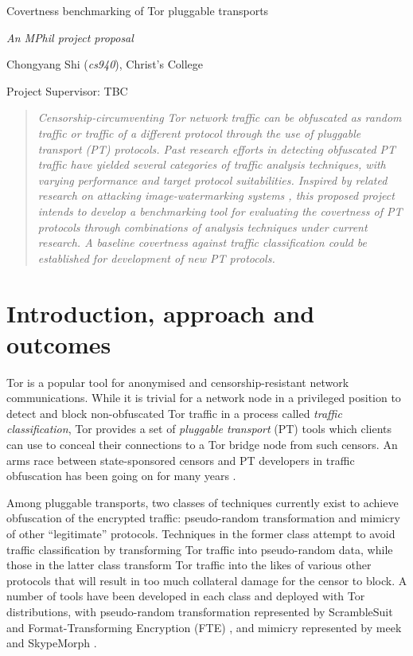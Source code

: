 \documentclass[11pt]{article}
\begin{document}
\centerline{\Large Covertness benchmarking of Tor pluggable transports}
\vspace{2em}
\centerline{\Large \emph{An MPhil project proposal}}
\vspace{2em}
\centerline{\large Chongyang Shi (\emph{cs940}), Christ's College}
\vspace{1em}
\centerline{\large Project Supervisor: TBC}
\vspace{1em}

\begin{abstract}
\textsl{Censorship-circumventing Tor network traffic can be obfuscated as random traffic or traffic of a different protocol through the use of pluggable transport (PT) protocols. Past research efforts in detecting obfuscated PT traffic have yielded several categories of traffic analysis techniques, with varying performance and target protocol suitabilities. Inspired by related research on attacking image-watermarking systems \cite{petitcolas1998attacks}, this proposed project intends to develop a benchmarking tool for evaluating the covertness of PT protocols through combinations of analysis techniques under current research. A baseline covertness against traffic classification could be established for development of new PT protocols.} 
\end{abstract}

\section{Introduction, approach and outcomes}

Tor is a popular tool for anonymised and censorship-resistant network communications. While it is trivial for a network node in a privileged position to detect and block non-obfuscated Tor traffic \cite[Tb. 6] {bujlow2015independent} in a process called \emph{traffic classification}, Tor provides a set of \emph{pluggable transport} (PT) tools which clients can use to conceal their connections to a Tor bridge node from such censors. An arms race between state-sponsored censors and PT developers in traffic obfuscation has been going on for many years \cite{khattak2014systemization}. 

Among pluggable transports, two classes of techniques currently exist to achieve obfuscation of the encrypted traffic: pseudo-random transformation and mimicry of other ``legitimate'' protocols. Techniques in the former class attempt to avoid traffic classification by transforming Tor traffic into pseudo-random data, while those in the latter class transform Tor traffic into the likes of various other protocols that will result in too much collateral damage for the censor to block. A number of tools have been developed in each class and deployed with Tor distributions, with pseudo-random transformation represented by ScrambleSuit \cite{winter2013scramblesuit} and Format-Transforming Encryption (FTE) \cite{dyer2013protocol}, and mimicry represented by meek \cite{fifield2015blocking} and SkypeMorph \cite{mohajeri2012skypemorph}. 
\end{document}
